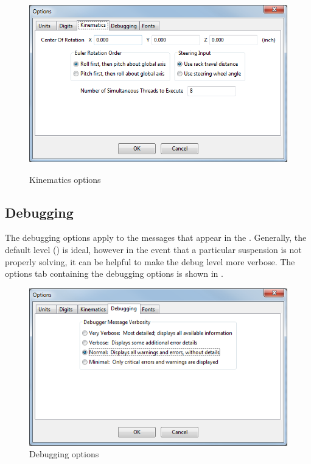 \begin{figure}
  \includegraphics[width=\textwidth]{images/optionsKinematics} \label{fig:optionsKinematics}
  \caption{Kinematics options}
  \centering
\end{figure}

\subsection{Debugging} \label{ssec:optionsDebugging}

The debugging options apply to the messages that appear in the .  Generally, the default level () is ideal, however in the event that a particular suspension is not properly solving, it can be helpful to make the debug level more verbose.  The options tab containing the debugging options is shown in .

\begin{figure}
  \includegraphics[width=\textwidth]{images/optionsDebugging}
  \caption{Debugging options} \label{fig:optionsDebugging}
  \centering
\end{figure}

